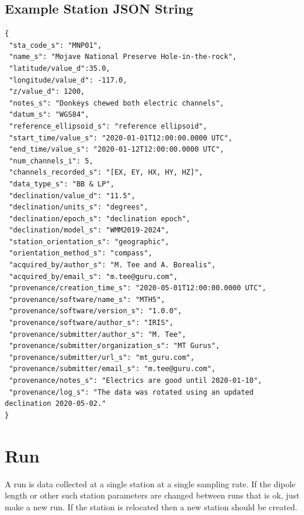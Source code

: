 \documentclass{article}
\begin{document}
\newpage
\subsection{Example Station JSON String}

\begin{verbatim}
{
 "sta_code_s": "MNP01",
 "name_s": "Mojave National Preserve Hole-in-the-rock",
 "latitude/value_d":35.0,
 "longitude/value_d": -117.0,
 "z/value_d": 1200,
 "notes_s": "Donkeys chewed both electric channels",
 "datum_s": "WGS84",
 "reference_ellipsoid_s": "reference ellipsoid",
 "start_time/value_s": "2020-01-01T12:00:00.0000 UTC",
 "end_time/value_s": "2020-01-12T12:00:00.0000 UTC",
 "num_channels_i": 5,
 "channels_recorded_s": "[EX, EY, HX, HY, HZ]",
 "data_type_s": "BB & LP",
 "declination/value_d": "11.5",
 "declination/units_s": "degrees",
 "declination/epoch_s": "declination epoch",
 "declination/model_s": "WMM2019-2024",
 "station_orientation_s": "geographic",
 "orientation_method_s": "compass",
 "acquired_by/author_s": "M. Tee and A. Borealis",
 "acquired_by/email_s": "m.tee@guru.com",
 "provenance/creation_time_s": "2020-05-01T12:00:00.0000 UTC",
 "provenance/software/name_s": "MTH5",
 "provenance/software/version_s": "1.0.0",
 "provenance/software/author_s": "IRIS",
 "provenance/submitter/author_s": "M. Tee",
 "provenance/submitter/organization_s": "MT Gurus",
 "provenance/submitter/url_s": "mt_guru.com",
 "provenance/submitter/email_s": "m.tee@guru.com",
 "provenance/notes_s": "Electrics are good until 2020-01-10",
 "provenance/log_s": "The data was rotated using an updated declination 2020-05-02."
}
\end{verbatim}


\newpage
\section{Run}

A run is data collected at a single station at a single sampling rate.  If the dipole length or other such station parameters are changed between runs that is ok, just make a new run.  If the station is relocated then a new station should be created.
\end{document}
